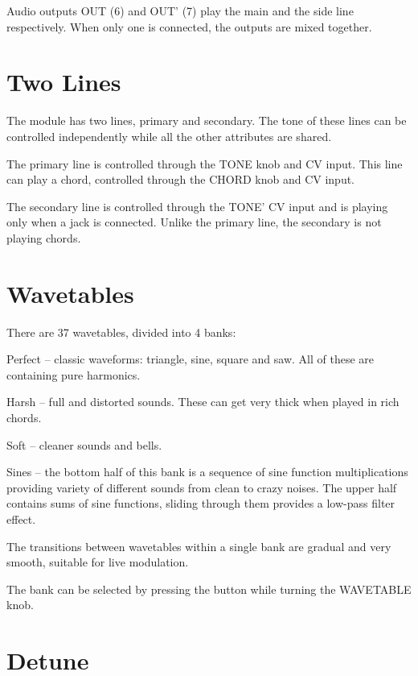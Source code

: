 \documentclass[10pt,nofoldmark,nocombine]{leaflet} %
\newenvironment{packed_enumerate_i}{
\begin{enumerate}[I]
  \setlength{\itemsep}{1pt}
  \setlength{\parskip}{0pt}
  \setlength{\parsep}{0pt}
}{\end{enumerate}}
\begin{document}
Audio outputs OUT (6) and OUT' (7) play the main and the side line respectively. When only one is connected,
the outputs are mixed together.

\section{Two Lines}

The module has two lines, primary and secondary. The tone of these lines can be controlled independently while all the other attributes are shared.

The primary line is controlled through the TONE knob and CV input. This line can play a chord, controlled through the CHORD knob and CV input.

The secondary line is controlled through the TONE' CV input and is playing only when a jack is connected. Unlike the primary line, the secondary is not playing chords.

\section{Wavetables}

There are 37 wavetables, divided into 4 banks:

\begin{packed_enumerate_i}
  \item Perfect -- classic waveforms: triangle, sine, square and saw. All of these are containing pure harmonics.
  \item Harsh -- full and distorted sounds. These can get very thick when played in rich chords.
  \item Soft -- cleaner sounds and bells.
  \item Sines -- the bottom half of this bank is a sequence of sine function multiplications providing variety of different sounds from clean to crazy noises. The upper half contains sums of sine functions, sliding through them provides a low-pass filter effect.
\end{packed_enumerate_i}

The transitions between wavetables within a single bank are gradual and very smooth, suitable for live modulation.

The bank can be selected by pressing the button while turning the WAVETABLE knob.

\section{Detune}
\end{document}
